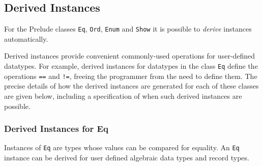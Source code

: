 \subsection{Derived Instances}

For the Prelude classes \texttt{Eq}, \texttt{Ord}, \texttt{Enum} and \texttt{Show} it is possible to \emph{derive} instances automatically.

\begin{flushleft}
   
\end{flushleft}

Derived instances provide convenient commonly-used operations for user-defined datatypes.
For example, derived instances for datatypes in the class \texttt{Eq} define the operations \texttt{==} and \texttt{!=}, freeing the programmer from the need to define them. The precise details of how
the derived instances are generated for each of these classes are given below,
including a specification of when such derived instances are possible.


\subsubsection{Derived Instances for Eq}

Instances of \texttt{Eq} are types whose values can be compared for equality. An \texttt{Eq} instance can be derived for user defined algebraic data types and record types.

